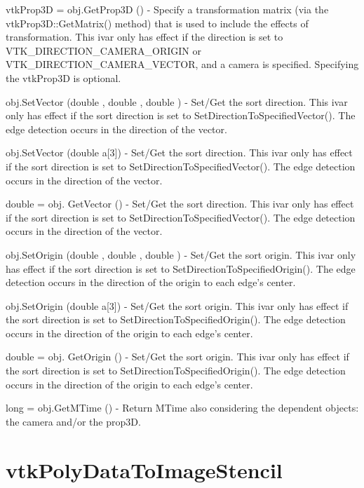 \begin{DoxyItemize}
\item {\ttfamily vtk\-Prop3\-D = obj.\-Get\-Prop3\-D ()} -\/ Specify a transformation matrix (via the vtk\-Prop3\-D\-::\-Get\-Matrix() method) that is used to include the effects of transformation. This ivar only has effect if the direction is set to V\-T\-K\-\_\-\-D\-I\-R\-E\-C\-T\-I\-O\-N\-\_\-\-C\-A\-M\-E\-R\-A\-\_\-\-O\-R\-I\-G\-I\-N or V\-T\-K\-\_\-\-D\-I\-R\-E\-C\-T\-I\-O\-N\-\_\-\-C\-A\-M\-E\-R\-A\-\_\-\-V\-E\-C\-T\-O\-R, and a camera is specified. Specifying the vtk\-Prop3\-D is optional.  
\item {\ttfamily obj.\-Set\-Vector (double , double , double )} -\/ Set/\-Get the sort direction. This ivar only has effect if the sort direction is set to Set\-Direction\-To\-Specified\-Vector(). The edge detection occurs in the direction of the vector.  
\item {\ttfamily obj.\-Set\-Vector (double a\mbox{[}3\mbox{]})} -\/ Set/\-Get the sort direction. This ivar only has effect if the sort direction is set to Set\-Direction\-To\-Specified\-Vector(). The edge detection occurs in the direction of the vector.  
\item {\ttfamily double = obj. Get\-Vector ()} -\/ Set/\-Get the sort direction. This ivar only has effect if the sort direction is set to Set\-Direction\-To\-Specified\-Vector(). The edge detection occurs in the direction of the vector.  
\item {\ttfamily obj.\-Set\-Origin (double , double , double )} -\/ Set/\-Get the sort origin. This ivar only has effect if the sort direction is set to Set\-Direction\-To\-Specified\-Origin(). The edge detection occurs in the direction of the origin to each edge's center.  
\item {\ttfamily obj.\-Set\-Origin (double a\mbox{[}3\mbox{]})} -\/ Set/\-Get the sort origin. This ivar only has effect if the sort direction is set to Set\-Direction\-To\-Specified\-Origin(). The edge detection occurs in the direction of the origin to each edge's center.  
\item {\ttfamily double = obj. Get\-Origin ()} -\/ Set/\-Get the sort origin. This ivar only has effect if the sort direction is set to Set\-Direction\-To\-Specified\-Origin(). The edge detection occurs in the direction of the origin to each edge's center.  
\item {\ttfamily long = obj.\-Get\-M\-Time ()} -\/ Return M\-Time also considering the dependent objects\-: the camera and/or the prop3\-D.  
\end{DoxyItemize}\hypertarget{vtkhybrid_vtkpolydatatoimagestencil}{}\section{vtk\-Poly\-Data\-To\-Image\-Stencil}\label{vtkhybrid_vtkpolydatatoimagestencil}
